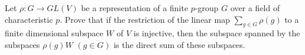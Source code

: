 Let $\rho:G\to GL(V)$ be a representation of a finite $p$-group $G$ over a field of characteristic $p$. Prove that if the restriction of the linear map $\sum_{g\in G} \rho(g)$ to a finite dimensional subspace $W$ of $V$ is injective, then the subspace spanned by the subspaces $\rho(g)W$ $(g\in G)$ is the direct sum of these subspaces.